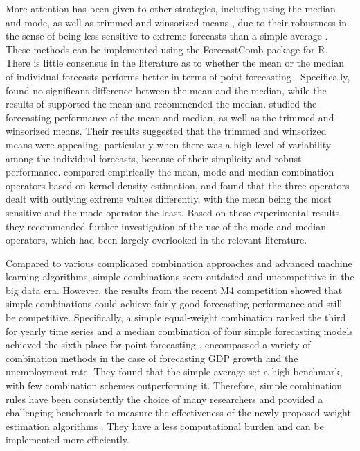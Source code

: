 \documentclass[11pt]{article}
\newcommand{\pkg}[1]{{\normalfont\fontseries{b}\selectfont #1}}
\let\proglang=\textsf
\begin{document}
More attention has been given to other strategies, including using the median and mode, as well as trimmed and winsorized means \citep[e.g.,][]{Chan1999-io,Stock2004-rq,Genre2013-ut,Jose2014-uh,Grushka-Cockayne2017-dj}, due to their robustness in the sense of being less sensitive to extreme forecasts than a simple average \citep{Lichtendahl2020-ut}. These methods can be implemented using the \pkg{ForecastComb} package for \proglang{R}. There is little consensus in the literature as to whether the mean or the median of individual forecasts performs better in terms of point forecasting \citep{Kolassa2011-ai}. Specifically, \cite{McNees1992-qc} found no significant difference between the mean and the median, while the results of \cite{Stock2004-rq} supported the mean and \cite{Agnew1985-dj} recommended the median. \cite{Jose2008-vm} studied the forecasting performance of the mean and median, as well as the trimmed and winsorized means. Their results suggested that the trimmed and winsorized means were appealing, particularly when there was a high level of variability among the individual forecasts, because of their simplicity and robust performance. \cite{Kourentzes2014-hs} compared empirically the mean, mode and median combination operators based on kernel density estimation, and found that the three operators dealt with outlying extreme values differently, with the mean being the most sensitive and the mode operator the least. Based on these experimental results, they recommended further investigation of the use of the mode and median operators, which had been largely overlooked in the relevant literature.

Compared to various complicated combination approaches and advanced machine learning algorithms, simple combinations seem outdated and uncompetitive in the big data era. However, the results from the recent M4 competition \citep{Makridakis2020-hu} showed that simple combinations could achieve fairly good forecasting performance and still be competitive. Specifically, a simple equal-weight combination ranked the third for yearly time series \citep{Shaub2019-on} and a median combination of four simple forecasting models achieved the sixth place for point forecasting \citep{Petropoulos2020-fp}. \cite{Genre2013-ut} encompassed a variety of combination methods in the case of forecasting GDP growth and the unemployment rate. They found that the simple average set a high benchmark, with few combination schemes outperforming it. Therefore, simple combination rules have been consistently the choice of many researchers and provided a challenging benchmark to measure the effectiveness of the newly proposed weight estimation algorithms \citep[e.g.,][]{Makridakis2000-he,Stock2004-rq,Makridakis2020-hu,Montero-Manso2020-tq,Kang2020-rl,Wang2021-un}. They have a less computational burden and can be implemented more efficiently.
\end{document}
